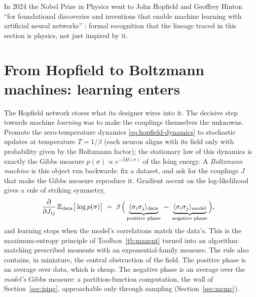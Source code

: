 In 2024 the Nobel Prize in Physics went to John Hopfield and Geoffrey
Hinton ``for foundational discoveries and inventions that enable machine
learning with artificial neural networks'' \citep{nobel2024physics}:
formal recognition that the lineage traced in this section is physics,
not just inspired by it.

\section{From Hopfield to Boltzmann machines: learning enters}
\label{sec:boltzmann-machines}

The Hopfield network stores what its designer wires into it. The decisive
step towards machine \emph{learning} was to make the couplings themselves
the unknowns. Promote the zero-temperature dynamics
\eqref{eq:hopfield-dynamics} to stochastic updates at temperature
$T = 1/\beta$ (each neuron aligns with its field only with probability
given by the Boltzmann factor); the stationary law of this dynamics is
exactly the Gibbs measure $p(\sigma) \propto e^{-\beta H(\sigma)}$ of the
Ising energy. A \emph{Boltzmann machine} \citep{ackley1985learning} is
this object run backwards: fix a dataset, and ask for the couplings $J$
that make the Gibbs measure reproduce it. Gradient ascent on the
log-likelihood gives a rule of striking symmetry,
\begin{equation}
  \frac{\partial}{\partial J_{ij}} \,\mathbb{E}_{\text{data}}\big[\log p(\sigma)\big]
  \;=\; \beta\,\Big(
  \underbrace{\langle \sigma_i \sigma_j \rangle_{\text{data}}}_{\text{positive phase}}
  \;-\;
  \underbrace{\langle \sigma_i \sigma_j \rangle_{\text{model}}}_{\text{negative phase}}
  \Big),
  \label{eq:bm-learning}
\end{equation}
and learning stops when the model's correlations match the data's. This
is the maximum-entropy principle of Toolbox~\ref{tb:maxent} turned into
an algorithm: matching prescribed moments with an exponential-family
measure. The rule also contains, in miniature, the central obstruction of
the field. The positive phase is an average over data, which is cheap.
The negative phase is an average over the \emph{model's} Gibbs measure: a
partition-function computation, the wall of Section~\ref{sec:ising},
approachable only through sampling
(Section~\ref{sec:mcmc}).

